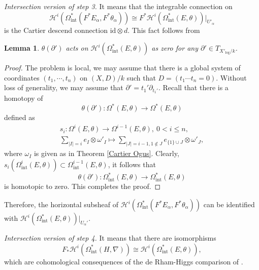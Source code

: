 \documentclass[12pt, a4paper]{article}
\newtheorem{lemma}{Lemma}[section]
\begin{document}
{\itshape Intersection version of step 3.} It means that the integrable connection on
$$
\mathcal H^i(\Omega_\mathrm{int}^*(F^*E_\alpha,F^*\theta_\alpha))\cong F^*\mathcal H^i(\Omega_\mathrm{int}^*(E,\theta))|_{U'_\alpha}
$$ 
is the Cartier descend connection $\mathrm{id}\otimes d$. This fact follows from
\begin{lemma}
$\theta(\partial')$ acts on $\mathcal H^i(\Omega_\mathrm{int}^*(E,\theta))$ as zero for any $\partial'\in T_{X'_{\log}/k}$.
\end{lemma}
\begin{proof}
The problem is local, we may assume that there is a global system of coordinates $(t_1,\cdots,t_n)$ on $(X,D)/k$ such that $D=(t_1\cdots t_n=0)$. Without loss of generality, we may assume that $\partial'=t_1'\partial_{t_1'}$. Recall that there is a homotopy of
$$
\theta(\partial'):\Omega^*(E,\theta)\to\Omega^*(E,\theta)
$$
defined as
$$
\begin{array}{c}
s_i:\Omega^i(E,\theta)\to\Omega^{i-1}(E,\theta),~0<i\leq n,\\
\sum_{|I|=i}e_I\otimes\omega'_I\mapsto\sum_{|J|=i-1,1\notin J}e_{\{1\}\cup J}\otimes\omega'_J,
\end{array}
$$
where $\omega_I$ is given as in Theorem \ref{Cartier Ogus}.
Clearly, $s_i(\Omega_\mathrm{int}^i(E,\theta))\subset\Omega_\mathrm{int}^{i-1}(E,\theta)$, it follows that
$$
\theta(\partial'):\Omega_\mathrm{int}^*(E,\theta)\to\Omega_\mathrm{int}^*(E,\theta)
$$
is homotopic to zero. This completes the proof.
\end{proof}

Therefore, the horizontal subsheaf of $\mathcal H^i(\Omega_\mathrm{int}^*(F^*E_\alpha,F^*\theta_\alpha))$ can be identified with $\mathcal H^i(\Omega_\mathrm{int}^*(E,\theta))|_{U_\alpha'}$.
 
{\itshape Intersection version of step 4.} It means that there are isomorphisms
$$
F_*\mathcal H^i(\Omega_\mathrm{int}^*(H,\nabla))\cong\mathcal H^i(\Omega_\mathrm{int}^*(E,\theta)),
$$
which are cohomological consequences of the de Rham-Higgs comparison of \cite{SZ2}.
\end{document}
